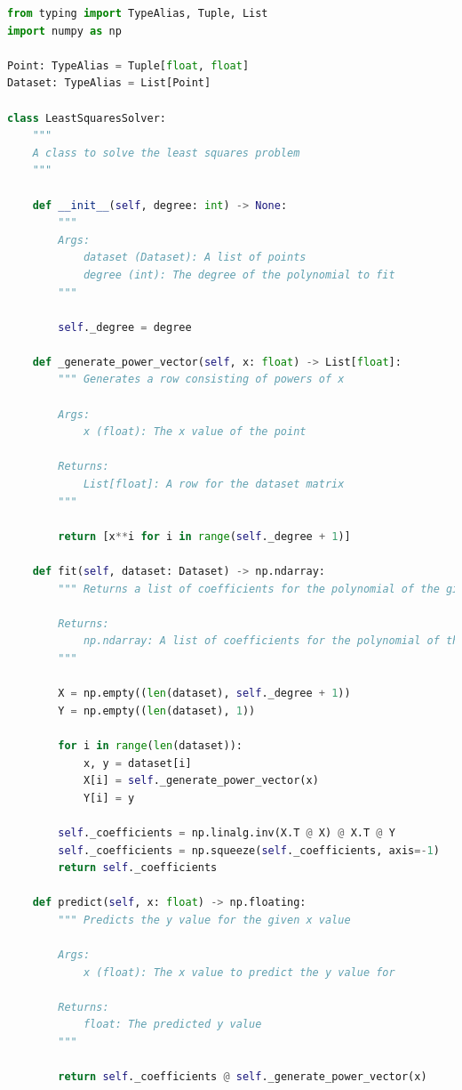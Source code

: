 \documentclass[12pt]{extarticle}
\begin{document}
\begin{lstlisting}[language=Python, caption=Реалізація пошуку коефіцієнтів методом найменших квадратів]
from typing import TypeAlias, Tuple, List
import numpy as np

Point: TypeAlias = Tuple[float, float]
Dataset: TypeAlias = List[Point]

class LeastSquaresSolver:
    """
    A class to solve the least squares problem
    """
    
    def __init__(self, degree: int) -> None:
        """
        Args:
            dataset (Dataset): A list of points
            degree (int): The degree of the polynomial to fit
        """
        
        self._degree = degree

    def _generate_power_vector(self, x: float) -> List[float]:
        """ Generates a row consisting of powers of x
        
        Args:
            x (float): The x value of the point
        
        Returns:
            List[float]: A row for the dataset matrix
        """
        
        return [x**i for i in range(self._degree + 1)]

    def fit(self, dataset: Dataset) -> np.ndarray:
        """ Returns a list of coefficients for the polynomial of the given degree
        
        Returns:
            np.ndarray: A list of coefficients for the polynomial of the given degree (degree + 1)
        """
        
        X = np.empty((len(dataset), self._degree + 1))
        Y = np.empty((len(dataset), 1))
        
        for i in range(len(dataset)):
            x, y = dataset[i]
            X[i] = self._generate_power_vector(x)
            Y[i] = y
                
        self._coefficients = np.linalg.inv(X.T @ X) @ X.T @ Y
        self._coefficients = np.squeeze(self._coefficients, axis=-1)
        return self._coefficients
    
    def predict(self, x: float) -> np.floating:
        """ Predicts the y value for the given x value
        
        Args:
            x (float): The x value to predict the y value for
        
        Returns:
            float: The predicted y value
        """
        
        return self._coefficients @ self._generate_power_vector(x)
\end{lstlisting}
\end{document}
